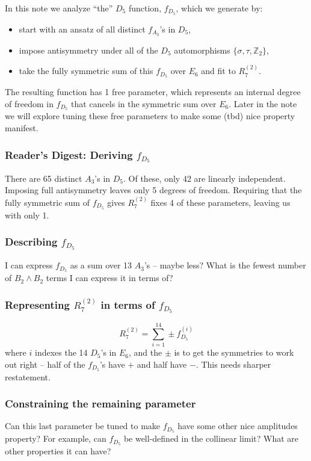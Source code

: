 \documentclass[12pt]{article}
\def\a{\mathcal{A}}
\def\fd5{f_{D_5}}
\def\fa3{f_{A_3}}
\def\a2{A_2}
\def\a3{A_3}
\def\d5{D_5}
\def\r27{R^{(2)}_7}
\def\e6{E_6}
\def\bb2{B_2\wedge B_2}
\begin{document}
\thispagestyle{fancyplain}
 
\fancyhf{} 
 
\cfoot{\fancyplain{}{\thepage}}

\lhead{\textbf{Describing the $\d5$ function} \hfill \today}

In this note we analyze ``the'' $\d5$ function, $\fd5$, which we generate by:
\begin{itemize}
	\item start with an ansatz of all distinct $\fa3$'s in $\d5$,
	\item impose antisymmetry under all of the $\d5$ automorphisms $\{\sigma, \tau, \mathbb{Z}_2\}$,
	\item take the fully symmetric sum of this $\fd5$ over $\e6$ and fit to $\r27$.
\end{itemize}
The resulting function has 1 free parameter, which represents an internal degree of freedom in $\fd5$ that cancels in the symmetric sum over $\e6$. Later in the note we will explore tuning these free parameters to make some (tbd) nice property manifest.

\subsubsection*{Reader's Digest: Deriving $\fd5$}

There are 65 distinct $\a3$'s in $\d5$. Of these, only 42 are linearly independent. Imposing full antisymmetry leaves only 5 degrees of freedom. Requiring that the fully symmetric sum of $\fd5$ gives $\r27$ fixes 4 of these parameters, leaving us with only 1. 

\subsubsection*{Describing $\fd5$}

I can express $\fd5$ as a sum over 13 $\a3$'s -- maybe less? What is the fewest number of $\bb2$ terms I can express it in terms of?

\subsubsection*{Representing $\r27$ in terms of $\fd5$}

\begin{equation}
	\r27 = \sum_{i=1}^{14} \pm \fd5^{(i)}
\end{equation}
where $i$ indexes the 14 $\d5$'s in $\e6$, and the $\pm$ is to get the symmetries to work out right -- half of the $\fd5$'s have $+$ and half have $-$. This needs sharper restatement. 

\subsubsection*{Constraining the remaining parameter}

Can this last parameter be tuned to make $\fd5$ have some other nice amplitudes property? For example, can $\fd5$ be well-defined in the collinear limit? What are other properties it can have?
\end{document}
